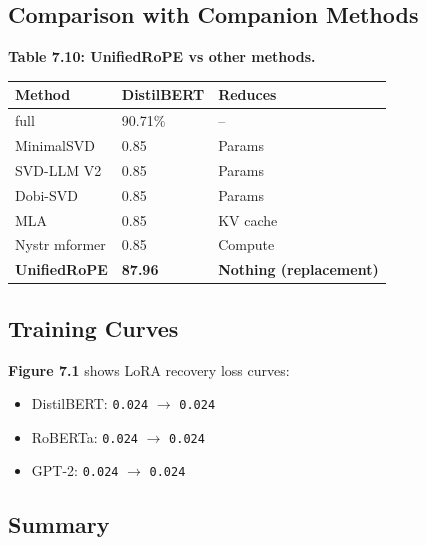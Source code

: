 {\subsection{Comparison with Companion Methods}

\textbf{Table 7.10: UnifiedRoPE vs other methods.}

\begin{table}[H]
\centering
\small
\begin{tabular}{lll}
\toprule
\textbf{Method} & \textbf{DistilBERT} & \textbf{Reduces} \\
\midrule
full & 90.71\% & -- \\
MinimalSVD & 0.85 & Params \\
SVD-LLM V2 & 0.85 & Params \\
Dobi-SVD & 0.85 & Params \\
MLA & 0.85 & KV cache \\
Nystr mformer & 0.85 & Compute \\
\textbf{UnifiedRoPE} & \textbf{87.96} & \textbf{Nothing (replacement)} \\
\bottomrule
\end{tabular}
\end{table}

\subsection{Training Curves}

\textbf{Figure 7.1} shows LoRA recovery loss curves:

\begin{itemize}
\item DistilBERT: \texttt{0.024} $\to$ \texttt{0.024}
\item RoBERTa: \texttt{0.024} $\to$ \texttt{0.024}
\item GPT-2: \texttt{0.024} $\to$ \texttt{0.024}

\end{itemize}
\subsection{Summary}

\begin{lstlisting}


\end{lstlisting}}
